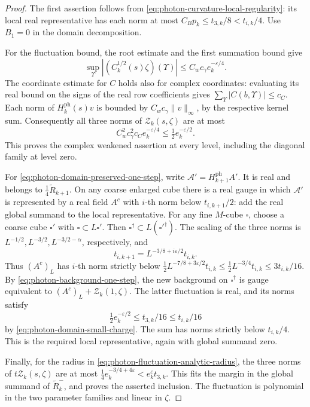 \begin{proof}
The first assertion follows from
\eqref{eq:photon-curvature-local-regularity}: its local real
representative has each norm at most
$C_Bp_k\le t_{3,k}/8<t_{i,k}/4$. Use $B_1=0$ in the domain
decomposition.

For the fluctuation bound, the root estimate and the first
summation bound give
\[
 \sup_\Upsilon|(C_k^{1/2}(s)\zeta)(\Upsilon)|
                         \le C_wc_\gamma e_k^{-\varepsilon/4}.
\]
The coordinate estimate for $C$ holds also for complex
coordinates: evaluating its real bound on the signs of the real
row coefficients gives $\sum_\Upsilon|C(b,\Upsilon)|\le c_C$.
Each norm of $H_k^{\mathrm{ph}}(s)v$ is bounded by
$C_wc_\gamma\|v\|_\infty$, by the respective kernel sum.
Consequently all three norms of $\mathscr Z_k(s,\zeta)$ are at most
\[
 C_w^2c_\gamma^2c_Ce_k^{-\varepsilon/4}
                                     \le\tfrac12e_k^{-\varepsilon/2}.
\]
This proves the complex weakened assertion at every level,
including the diagonal family at level zero.

For \eqref{eq:photon-domain-preserved-one-step}, write
$\mathscr A'=H_{k+1}^{\mathrm{ph}}A'$. It is real and belongs to
$\frac14\widetilde R_{k+1}$. On any coarse enlarged cube there
is a real gauge in which $\mathscr A'$ is represented by a real
field $A^c$ with $i$-th norm below $t_{i,k+1}/2$: add the real
global summand to the local representative. For any fine
$M$-cube $\square$, choose a coarse cube $\square'$ with
$\square\subset L\square'$. Then
$\square^\dagger\subset L(\square'^\dagger)$.
The scaling of the three norms is
$L^{-1/2},L^{-3/2},L^{-3/2-\alpha}$, respectively, and
\[
 t_{i,k+1}=L^{-3/8+i\varepsilon/2}t_{i,k}.
\]
Thus $(A^c)_L$ has $i$-th norm strictly below
$\frac12L^{-7/8+3\varepsilon/2}t_{i,k}
\le\frac12L^{-3/4}t_{i,k}\le3t_{i,k}/16$.
By \eqref{eq:photon-background-one-step}, the new background on
$\square^\dagger$ is gauge equivalent to
$(A^c)_L+\mathscr Z_k(1,\zeta)$. The latter fluctuation is real,
and its norms satisfy
\[
 \tfrac12e_k^{-\varepsilon/2}\le t_{3,k}/16\le t_{i,k}/16
\]
by \eqref{eq:photon-domain-small-charge}. The sum has norms
strictly below $t_{i,k}/4$. This is the required local
representative, again with global summand zero.

Finally, for the radius in \eqref{eq:photon-fluctuation-analytic-radius},
the three norms of $t\mathscr Z_k(s,\zeta)$ are at most
$\frac14e_k^{-3/4+4\varepsilon}<e_k^\varepsilon t_{3,k}$.
This fits the margin in the global summand of $\widetilde R_k^-$,
and proves the asserted inclusion. The fluctuation is polynomial
in the two parameter families and linear in $\zeta$.
\end{proof}

